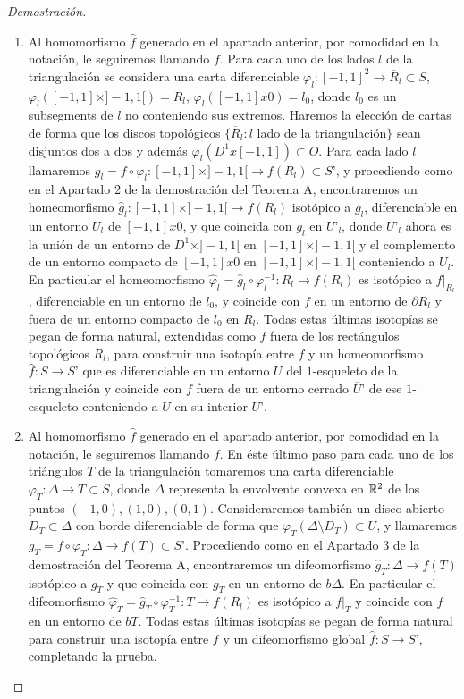 \begin{proof}[Demostración]
\begin{enumerate}
		\item Al homomorfismo $\hat f$ generado en el apartado anterior, por comodidad en la notación, le seguiremos llamando $f$. Para cada uno de los lados $l$ de la triangulación se considera una carta diferenciable $\varphi_l\colon [-1,1]^2\to \overline{R}_l\subset S$, $\varphi_l([-1,1]\times ]-1,1[)=R_l$, $\varphi_l([-1,1] x 0)=l_0$, donde $l_0$ es un subsegments de $l$ no conteniendo sus extremos. Haremos la elección de cartas de forma que los discos topológicos $\{\overline{R}_l\colon l$ lado de la triangulación$\}$ sean disjuntos dos a dos y además $\varphi_l(D^1 x [-1,1])\subset O$. Para cada lado $l$ llamaremos $g_l=f\circ \varphi_l:[-1,1]\times ]-1,1[\to f(R_l)\subset S’$, y procediendo como en el Apartado 2 de la demostración del Teorema A, encontraremos un homeomorfismo $\hat g_l:[-1,1]\times ]-1,1[\to f(R_l)$ isotópico a  $g_l$, diferenciable en un entorno $U_l$ de $[-1,1] x 0$, y que coincida con $g_l$ en $U’_l$, donde $U’_l$ ahora es la unión de un entorno de $D^1 \times ]-1,1[$ en $[-1,1]\times ]-1,1[$  y el complemento de un entorno compacto de $[-1,1] x 0$ en $[-1,1]\times ]-1,1[$ conteniendo a $U_l$. En particular el homeomorfismo $\hat \varphi_l=\hat g_l\circ \varphi_l^{-1}:R_l\to f(R_l)$ es isotópico a  $f|_{R_l}$, diferenciable en un entorno de $l_0$, y  coincide con $f$ en un entorno de $\partial R_l$ y fuera de un entorno compacto de $l_0$ en $R_l$. Todas estas últimas isotopías se pegan de forma natural, extendidas como $f$ fuera de los rectángulos topológicos $R_l$, para construir una isotopía entre $f$ y un homeomorfismo $\hat f\colon S\to S’$ que es diferenciable en un entorno $U$ del $1$-esqueleto de la triangulación y coincide con $f$ fuera de un entorno cerrado $\overline{U}’$ de ese $1$-esqueleto conteniendo a $\overline U$ en su interior $U’$.

		\item Al homomorfismo $\hat f$ generado en el apartado anterior, por comodidad en la notación, le seguiremos llamando $f$.  En éste último paso para cada uno de los triángulos $T$ de la triangulación tomaremos una carta diferenciable $\varphi_T\colon \Delta \to T\subset S$, donde $\Delta$ representa la envolvente convexa en $\mathbb{R}^2$ de los puntos $(-1,0), (1,0), (0,1)$. Consideraremos también un disco abierto $D_T \subset \Delta$ con borde diferenciable de forma que $\varphi_T(\Delta\setminus D_T)\subset U$, y llamaremos $g_T=f\circ \varphi_T:\Delta \to f(T)\subset S’$. Procediendo como en el Apartado 3 de la demostración del Teorema A, encontraremos un difeomorfismo $\hat g_T:\Delta\to f(T)$ isotópico a  $g_T$ y que coincida con $g_T$ en un entorno de $b\Delta$. En particular el difeomorfismo $\hat \varphi_T=\hat g_T\circ \varphi_T^{-1}:T\to f(R_l)$ es isotópico a  $f|_{T}$ y  coincide con $f$ en un entorno de $bT$. Todas estas últimas isotopías se pegan de forma natural para construir una isotopía entre $f$ y un difeomorfismo global $\hat f\colon S\to S’$, completando la prueba.
		\end{enumerate}
	\end{proof}
\endinput

